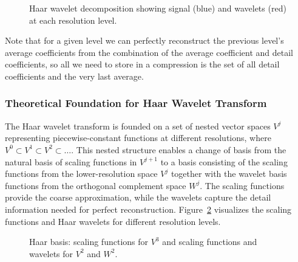 \begin{figure}[ht]
  \centering
  
  \caption{Haar wavelet decomposition showing signal (blue) and wavelets (red) at each resolution level.}
  \label{fig:haar_decomposition}
\end{figure}

Note that for a given level we can perfectly reconstruct the previous level's average coefficients from the combination of the average coefficient and detail coefficients, so all we need to store in a compression is the set of all detail coefficients and the very last average.

\subsubsection{Theoretical Foundation for Haar Wavelet Transform}

The Haar wavelet transform is founded on a set of nested vector spaces $V^j$ representing piecewise-constant functions at different resolutions, where $V^0 \subset V^1 \subset V^2 \subset \dots$. This nested structure enables a change of basis from the natural basis of scaling functions in $V^{j+1}$ to a basis consisting of the scaling functions from the lower-resolution space $V^j$ together with the wavelet basis functions from the orthogonal complement space $W^j$. The scaling functions provide the coarse approximation, while the wavelets capture the detail information needed for perfect reconstruction. Figure~\ref{fig:basis_functions} visualizes the scaling functions and Haar wavelets for different resolution levels.

\begin{figure}[hbt]
  \centering
  \begin{minipage}{\textwidth}
    \centering
    
    \label{fig:scaling_functions}
  \end{minipage}
  \vspace{0.5cm}
  \begin{minipage}{\textwidth}
    \centering
    
    \label{fig:wavelet_basis}
  \end{minipage}
  \caption{Haar basis: scaling functions for $V^3$ and scaling functions and wavelets for $V^2$ and $W^2$.}
  \label{fig:basis_functions}
\end{figure}

